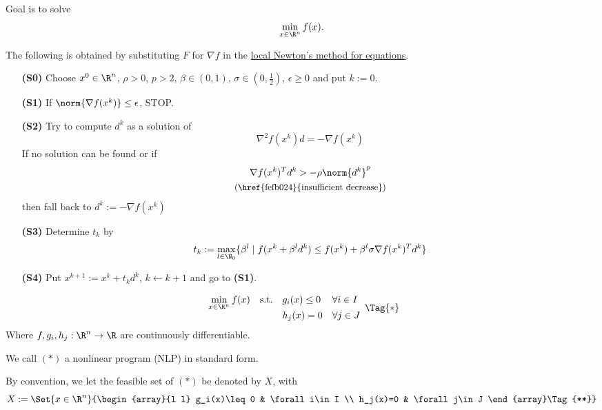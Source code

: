 \label{a7a5665}

Goal is to solve
$$\min_{x\in\R^n}f(x).$$

The following is obtained by substituting $F$ for $\nabla f$ in the
\href{abbc9be}{local Newton's method for equations}.

\begin{enumerate}
	\item [\textbf{(S0)}] Choose $x^0\in\R^n$, $\rho>0$, $p>2$, $\beta\in(0,1)$, $\sigma\in(0,\frac12)$, $\epsilon\geq0$ and put $k:=0$.
	\item [\textbf{(S1)}] If $\norm{\nabla f(x^k)}\leq\epsilon$, STOP.
	\item [\textbf{(S2)}] Try to compute $d^k$ as a solution of
	      $$\nabla^2f(x^k)d=-\nabla f(x^k)$$
	      If no solution can be found or if
	      \begin{gather*}
		      \nabla f(x^k)^Td^k>-\rho\norm{d^k}^p\\
		      \text{\small{(\href{fefb024}{insufficient decrease})}}
	      \end{gather*}
	      then fall back to $d^k:=-\nabla f(x^k)$
	\item [\textbf{(S3)}] Determine $t_k$ by
	      $$t_k:=\max_{l\in\N_0}\{\beta^l\mid f(x^k+\beta^ld^k)\leq f(x^k)+\beta^l\sigma\nabla f(x^k)^Td^k\}$$
	\item [\textbf{(S4)}] Put $x^{k+1}:=x^k+t_kd^k$, $k\gets k+1$ and go to \textbf{(S1)}.
\end{enumerate}

\label{bbe9993}

\begin{equation}
	\begin{array}{l l l l}
		\displaystyle \min_{x\in\R^n}f(x)
		 & \text{s.t.} & g_i(x)\leq0 & \forall i\in I \\
		 &             & h_j(x)=0    & \forall j\in J
	\end{array}\Tag{*}
\end{equation}
Where $f,g_i,h_j:\R^n\to\R$ are continuously differentiable.

We call $(*)$ a nonlinear program (NLP) in standard form.

By convention, we let the feasible set of $(*)$ be denoted by $X$, with
\begin{equation}
	X:=\Set{x\in\R^n}{\begin{array}{l l}
			g_i(x)\leq0 & \forall i\in I \\
			h_j(x)=0    & \forall j\in J
		\end{array}\Tag{**}}
\end{equation}

